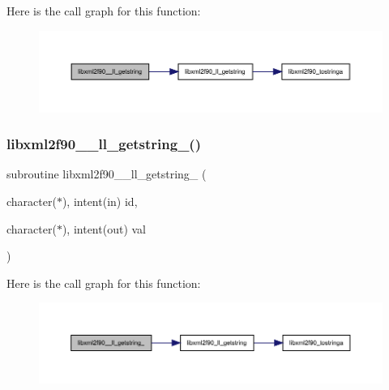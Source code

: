 Here is the call graph for this function\+:
\nopagebreak
\begin{figure}[H]
\begin{center}
\leavevmode
\includegraphics[width=350pt]{libxml2f90_8f90__pp_8f90_ab60330c194bfbef4790a34db8f896d24_cgraph}
\end{center}
\end{figure}
\mbox{\label{libxml2f90_8f90__pp_8f90_a5a0b5cda999773856f04bc2047a3a95e}} 
\subsubsection{\texorpdfstring{libxml2f90\+\_\+\+\_\+ll\+\_\+getstring\+\_\+()}{libxml2f90\_\_ll\_getstring\_()}}
{\footnotesize\ttfamily subroutine libxml2f90\+\_\+\+\_\+ll\+\_\+getstring\+\_\+ (\begin{DoxyParamCaption}\item[{character($\ast$), intent(in)}]{id,  }\item[{character($\ast$), intent(out)}]{val }\end{DoxyParamCaption})}

Here is the call graph for this function\+:
\nopagebreak
\begin{figure}[H]
\begin{center}
\leavevmode
\includegraphics[width=350pt]{libxml2f90_8f90__pp_8f90_a5a0b5cda999773856f04bc2047a3a95e_cgraph}
\end{center}
\end{figure}
\mbox{\label{libxml2f90_8f90__pp_8f90_a113f047d3ac5fe6e1573d1c123afbd87}} 
